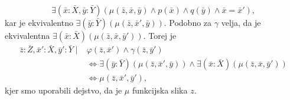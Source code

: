 \documentclass[../kategoricna_logika.tex]{subfiles}
\begin{document}
\begin{dokaz}
\begin{enumerate}[label=(\roman*)]
    \[ \exists (\bar{x}:\bar{X},\bar{y}:\bar{Y}) (\mu(\bar{z},\bar{x},\bar{y}) \land p(\bar{x}) \land q(\bar{y}) \land \bar{x}=\bar{x}'),\]
    kar
    je ekvivalentno $\exists (\bar{y}:\bar{Y})(\mu(\bar{z},\bar{x}',\bar{y}))$.  Podobno za $\gamma$
    velja, da je ekvivalentna $\exists (\bar{x}:\bar{X})(\mu(\bar{z},\bar{x},\bar{y}'))$. Torej je
    \begin{align*}
      \bar{z}:\bar{Z}, \bar{x}':\bar{X},\bar{y}':\bar{Y} \mid& \varphi(\bar{z},\bar{x}') \land \gamma(\bar{z},\bar{y}') \\
      &\iff \exists (\bar{y}:\bar{Y})(\mu(\bar{z},\bar{x}',\bar{y})) \land \exists (\bar{x}:\bar{X})(\mu(\bar{z},\bar{x},\bar{y}')) \\
                                       &\iff \mu(\bar{z},\bar{x}',\bar{y}'),
    \end{align*}
    kjer smo uporabili dejstvo, da je $\mu$ funkcijska slika $z$.


\end{enumerate}
\end{dokaz}
\end{document}
